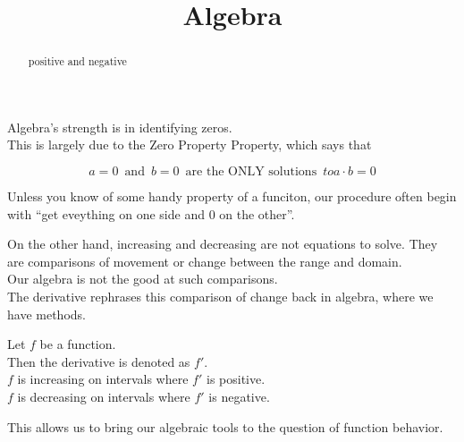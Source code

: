 \documentclass{ximera}
\title{Algebra}
\begin{document}
\begin{abstract}
positive and negative
\end{abstract}
\maketitle



Algebra's strength is in identifying zeros. \\


This is largely due to the Zero Property Property, which says that 



\[
a = 0 \, \text{ and } \, b = 0 \, \text{ are the ONLY solutions } \, to a \cdot b = 0
\]


Unless you know of some handy property of a funciton, our procedure often begin with ``get eveything on one side and $0$ on the other''.




On the other hand, increasing and decreasing are not equations to solve.  They are comparisons of movement or change between the range and domain. \\

Our algebra is not the good at such comparisons. \\


The derivative rephrases this comparison of change back in algebra, where we have methods. \\





\begin{template}

Let $f$ be a function. \\

Then the derivative is denoted as $f'$. \\


$f$ is increasing on intervals where $f'$ is positive. \\


$f$ is decreasing on intervals where $f'$ is negative. \\


\end{template}

This allows us to bring our algebraic tools to the question of function behavior. \\
\end{document}
